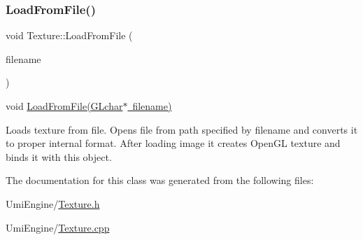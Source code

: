 \subsubsection{\texorpdfstring{LoadFromFile()}{LoadFromFile()}}
{\footnotesize\ttfamily void Texture\+::\+Load\+From\+File (\begin{DoxyParamCaption}\item[{G\+Lchar $\ast$}]{filename }\end{DoxyParamCaption})}



void \mbox{\hyperlink{class_texture_a26134f37b4a22ff895686533937ba218}{Load\+From\+File(\+G\+Lchar$\ast$ filename)}} 

Loads texture from file. Opens file from path specified by filename and converts it to proper internal format. After loading image it creates Open\+GL texture and binds it with this object. 

The documentation for this class was generated from the following files\+:\begin{DoxyCompactItemize}
\item 
Umi\+Engine/\mbox{\hyperlink{_texture_8h}{Texture.\+h}}\item 
Umi\+Engine/\mbox{\hyperlink{_texture_8cpp}{Texture.\+cpp}}\end{DoxyCompactItemize}
